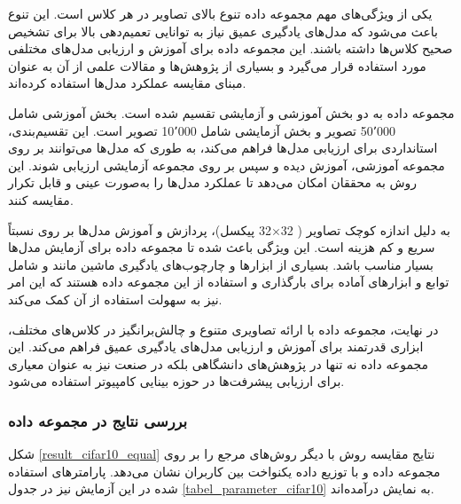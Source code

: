 یکی از ویژگی‌های مهم مجموعه داده
تنوع بالای تصاویر در هر کلاس است. این تنوع باعث می‌شود که مدل‌های یادگیری عمیق نیاز به توانایی تعمیم‌دهی بالا برای تشخیص صحیح کلاس‌ها داشته باشند. این مجموعه داده برای آموزش و ارزیابی مدل‌های مختلفی مورد استفاده قرار می‌گیرد و بسیاری از پژوهش‌ها و مقالات علمی از آن به عنوان مبنای مقایسه عملکرد مدل‌ها استفاده کرده‌اند.

مجموعه داده
به دو بخش آموزشی و آزمایشی تقسیم شده است. بخش آموزشی شامل 50٬000 تصویر و بخش آزمایشی شامل 10٬000 تصویر است. این تقسیم‌بندی، استانداردی برای ارزیابی مدل‌ها فراهم می‌کند، به طوری که مدل‌ها می‌توانند بر روی مجموعه آموزشی، آموزش دیده و سپس بر روی مجموعه آزمایشی ارزیابی شوند. این روش به محققان امکان می‌دهد تا عملکرد مدل‌ها را به‌صورت عینی و قابل تکرار مقایسه کنند.

به دلیل اندازه کوچک تصاویر (%
32$\times$32
پیکسل)، پردازش و آموزش مدل‌ها بر روی
نسبتاً سریع و کم هزینه است. این ویژگی باعث شده تا مجموعه داده 
برای آزمایش مدل‌ها بسیار مناسب باشد. بسیاری از ابزارها و چارچوب‌های%
یادگیری ماشین مانند
و
شامل توابع و ابزارهای آماده برای بارگذاری و استفاده از این مجموعه داده هستند که این امر نیز به سهولت استفاده از آن کمک می‌کند.

در نهایت، مجموعه داده
با ارائه تصاویری متنوع و چالش‌برانگیز در کلاس‌های مختلف، ابزاری قدرتمند برای آموزش و ارزیابی مدل‌های یادگیری عمیق فراهم می‌کند. این مجموعه داده نه تنها در پژوهش‌های دانشگاهی بلکه در صنعت نیز به عنوان معیاری برای ارزیابی پیشرفت‌ها در حوزه بینایی کامپیوتر استفاده می‌شود.


\vspace{3mm}
\subsubsection{
	بررسی نتایج در مجموعه داده
}\vspace{-1mm}


شکل
\ref{result_cifar10_equal}
نتایج مقایسه روش
با دیگر روش‌های مرجع را بر روی مجموعه داده
و با توزیع داده یکنواخت بین کاربران نشان می‌دهد. پارامترهای استفاده شده در این آزمایش نیز در جدول
\ref{tabel_parameter_cifar10}
به نمایش درآمده‌اند.


